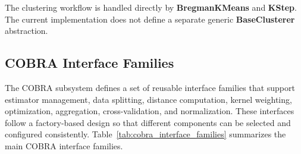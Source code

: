 The clustering workflow is handled directly by \textbf{BregmanKMeans} and \textbf{KStep}. The current implementation does not define a separate generic \textbf{BaseClusterer} abstraction.

\subsection{COBRA Interface Families}

\hs The COBRA subsystem defines a set of reusable interface families that support estimator management, data splitting, distance computation, kernel weighting, optimization, aggregation, cross-validation, and normalization. These interfaces follow a factory-based design so that different components can be selected and configured consistently. Table~\ref{tab:cobra_interface_families} summarizes the main COBRA interface families.

